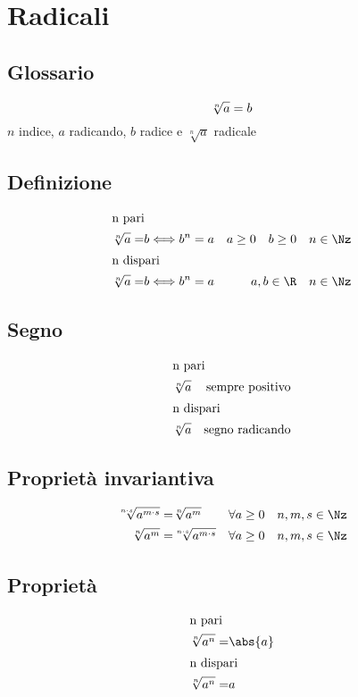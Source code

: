 \chapter{Radicali}
\section{Glossario}
\begin{equation}
\sqrt[n]{a}=b\\
\end{equation}
$n$ indice, $a$ radicando, $b$ radice e $\sqrt[n]{a}$ radicale
\section{Definizione}
\begin{align}
\intertext{n pari}
\sqrt[n]{a}=&b\Longleftrightarrow b^n=a&a\geq0\quad b\geq0\quad n\in\Nz\\
\intertext{n dispari}
\sqrt[n]{a}=&b\Longleftrightarrow b^n=a&a,b\in\R\quad n\in\Nz
\end{align}
\section{Segno}
\begin{align}
\intertext{n pari}
\sqrt[n]{a}&&\text{sempre positivo}\\
\intertext{n dispari}
\sqrt[n]{a}&&\text{segno radicando}
\end{align}
\section{Proprietà invariantiva}
\begin{align}
\sqrt[n\cdot s]{a^{m\cdot s}}=&\sqrt[n]{a^m}&\forall a\geq 0\quad n,m,s\in\Nz\\
\sqrt[n]{a^m}=&\sqrt[n\cdot s]{a^{m\cdot s}}&\forall a\geq 0\quad n,m,s\in\Nz
\end{align}
\section{Proprietà}
\begin{align}
\intertext{n pari}
\sqrt[n]{a^n}=&\abs{a}\\
\intertext{n dispari}
\sqrt[n]{a^n}=&a
\end{align}
